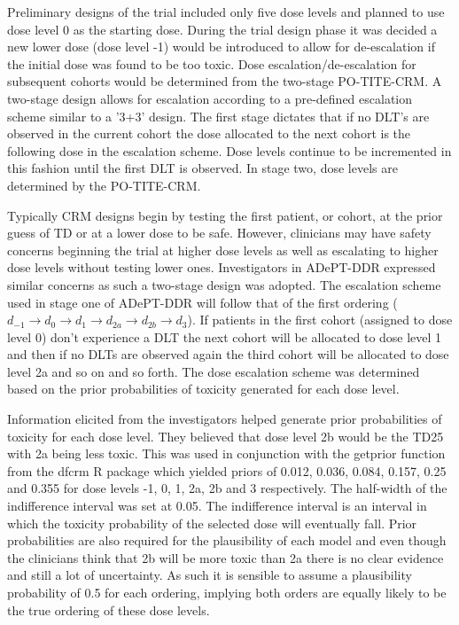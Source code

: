 Preliminary designs of the trial included only five dose levels and planned to use dose level 0 as the starting dose. During the trial design phase it was decided a new lower dose (dose level -1) would be introduced to allow for de-escalation if the initial dose was found to be too toxic. Dose escalation/de-escalation for subsequent cohorts would be determined from the two-stage PO-TITE-CRM. A two-stage design allows for escalation according to a pre-defined escalation scheme similar to a '3+3' design. The first stage dictates that if no DLT's are observed in the current cohort the dose allocated to the next cohort is the following dose in the escalation scheme. Dose levels continue to be incremented in this fashion until the first DLT is observed. In stage two, dose levels are determined by the PO-TITE-CRM.

Typically CRM designs begin by testing the first patient, or cohort, at the prior guess of TD or at a lower dose to be safe. However, clinicians may have safety concerns beginning the trial at higher dose levels as well as escalating to higher dose levels without testing lower ones. Investigators in ADePT-DDR expressed similar concerns as such a two-stage design was adopted. The escalation scheme used in stage one of ADePT-DDR will follow that of the first ordering ($d_{-1} \rightarrow d_{0} \rightarrow d_{1} \rightarrow d_{2a} \rightarrow d_{2b} \rightarrow d_{3}$). If patients in the first cohort (assigned to dose level 0) don't experience a DLT the next cohort will be allocated to dose level 1 and then if no DLTs are observed again the third cohort will be allocated to dose level 2a and so on and so forth. The dose escalation scheme was determined based on the prior probabilities of toxicity generated for each dose level.  

Information elicited from the investigators helped generate prior probabilities of toxicity for each dose level. They believed that dose level 2b would be the TD25 with 2a being less toxic. This was used in conjunction with the getprior function from the dfcrm R package \cite{cheungDfcrmDoseFindingContinual2019} which yielded priors of 0.012, 0.036, 0.084, 0.157, 0.25 and 0.355 for dose levels -1, 0, 1, 2a, 2b and 3 respectively. The half-width of the indifference interval was set at 0.05. The indifference interval is an interval in which the toxicity probability of the selected dose will eventually fall. Prior probabilities are also required for the plausibility of each model and even though the clinicians think that 2b will be more toxic than 2a there is no clear evidence and still a lot of uncertainty. As such it is sensible to assume a plausibility probability of 0.5 for each ordering, implying both orders are equally likely to be the true ordering of these dose levels. 

